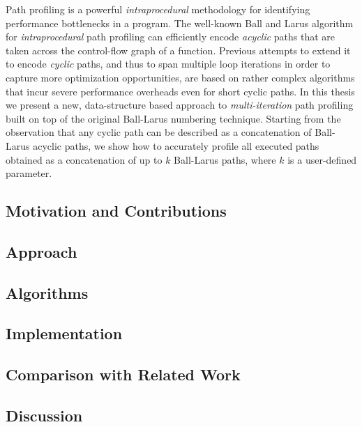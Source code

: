 Path profiling is a powerful {\em intraprocedural} methodology for identifying performance bottlenecks in a program. The well-known Ball and Larus algorithm for {\em intraprocedural} path profiling can efficiently encode {\em acyclic} paths that are taken across the control-flow graph of a function. Previous attempts to extend it to encode {\em cyclic} paths, and thus to span multiple loop iterations in order to capture more optimization opportunities, are based on rather complex algorithms that incur severe performance overheads even for short cyclic paths. In this thesis we present a new, data-structure based approach to {\em multi-iteration} path profiling built on top of the original Ball-Larus numbering technique. Starting from the observation that any cyclic path can be described as a concatenation of Ball-Larus acyclic paths, we show how to accurately profile all executed paths obtained as a concatenation of up to $k$ Ball-Larus paths, where $k$ is a user-defined parameter.


\subsection{Motivation and Contributions}

\subsection{Approach}

\subsection{Algorithms}

\subsection{Implementation}

\subsection{Comparison with Related Work}

\subsection{Discussion}